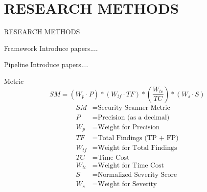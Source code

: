 \section{RESEARCH METHODS}
\begin{frame}[allowframebreaks]{RESEARCH METHODS}
  \begin{block}{Framework}
    Introduce papers....
  \end{block}
  \begin{block}{Pipeline}
    Introduce papers....
  \end{block}
  \framebreak
  \begin{block}{Metric}
    \begin{equation}
      SM = (W_p \cdot P) * (W_{tf} \cdot TF) * (\frac{W_{tc}}{TC}) * (W_s \cdot S)
    \end{equation}
    \begin{align*}
      SM & = \text{Security Scanner Metric} \\
      P & = \text{Precision (as a decimal)} \\
      W_p & = \text{Weight for Precision} \\
      TF & = \text{Total Findings (TP + FP)} \\
      W_{tf} & = \text{Weight for Total Findings} \\
      TC & = \text{Time Cost} \\
      W_{tc} & = \text{Weight for Time Cost} \\
      S & = \text{Normalized Severity Score} \\
      W_s & = \text{Weight for Severity}
    \end{align*}
  \end{block}
\end{frame}